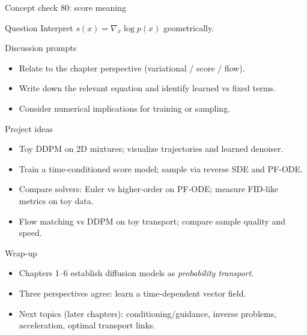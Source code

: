 \documentclass[aspectratio=169]{beamer}
\begin{document}
\begin{frame}{Concept check 80: score meaning}
\begin{block}{Question}
Interpret \(s(x)=\nabla_x\log p(x)\) geometrically.
\end{block}
\begin{block}{Discussion prompts}
\begin{itemize}
\item Relate to the chapter perspective (variational / score / flow).
\item Write down the relevant equation and identify learned vs fixed terms.
\item Consider numerical implications for training or sampling.
\end{itemize}
\end{block}
\end{frame}

\begin{frame}{Project ideas}
\begin{itemize}
\item Toy DDPM on 2D mixtures; visualize trajectories and learned denoiser.
\item Train a time-conditioned score model; sample via reverse SDE and PF-ODE.
\item Compare solvers: Euler vs higher-order on PF-ODE; measure FID-like metrics on toy data.
\item Flow matching vs DDPM on toy transport; compare sample quality and speed.
\end{itemize}
\end{frame}

\begin{frame}{Wrap-up}
\begin{itemize}
\item Chapters 1--6 establish diffusion models as \emph{probability transport}.
\item Three perspectives agree: learn a time-dependent vector field.
\item Next topics (later chapters): conditioning/guidance, inverse problems, acceleration, optimal transport links.
\end{itemize}
\end{frame}
\end{document}
